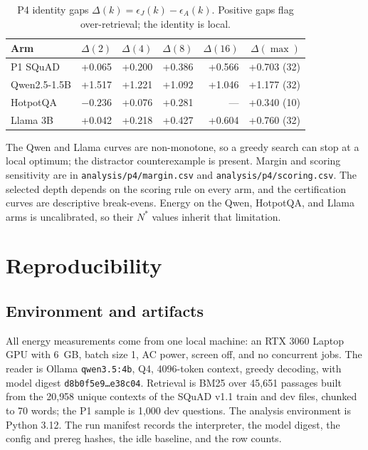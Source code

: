 \begin{table}[pos=htbp]
  \centering
  \caption{P4 identity gaps $\Delta(k)=\epsilon_J(k)-\epsilon_A(k)$. Positive
  gaps flag over-retrieval; the identity is local.}
  \label{tab:s10identity}
  \footnotesize
  \begin{tabular}{@{}lrrrrr@{}}
    \toprule
    \textbf{Arm} & $\Delta(2)$ & $\Delta(4)$ & $\Delta(8)$ & $\Delta(16)$ & $\Delta(\max)$ \\
    \midrule
    P1 SQuAD & +0.065 & +0.200 & +0.386 & +0.566 & +0.703 (32) \\
    Qwen2.5-1.5B & +1.517 & +1.221 & +1.092 & +1.046 & +1.177 (32) \\
    HotpotQA & $-0.236$ & +0.076 & +0.281 & --- & +0.340 (10) \\
    Llama 3B & +0.042 & +0.218 & +0.427 & +0.604 & +0.760 (32) \\
    \bottomrule
  \end{tabular}
\end{table}

The Qwen and Llama curves are non-monotone, so a greedy search can stop at a
local optimum; the distractor counterexample is present. Margin and scoring
sensitivity are in \texttt{analysis/p4/margin.csv} and
\texttt{analysis/p4/scoring.csv}. The selected depth depends on the scoring
rule on every arm, and the certification curves are descriptive break-evens.
Energy on the Qwen, HotpotQA, and Llama arms is uncalibrated, so their $N^*$
values inherit that limitation.

\section{Reproducibility}\label{sec:s7}

\subsection{Environment and artifacts}

All energy measurements come from one local machine: an RTX 3060 Laptop GPU with 6~GB, batch
size 1, AC power, screen off, and no concurrent jobs. The reader is Ollama
\texttt{qwen3.5:4b}, Q4, 4096-token context, greedy decoding, with model digest
\texttt{d8b0f5e9\ldots e38c04}. Retrieval is BM25 over 45{,}651 passages built from the 20{,}958
unique contexts of the SQuAD v1.1 train and dev files, chunked to 70 words; the P1 sample is
1{,}000 dev questions. The analysis
environment is Python 3.12. The run manifest records the interpreter, the model digest, the
config and prereg hashes, the idle baseline, and the row counts.

